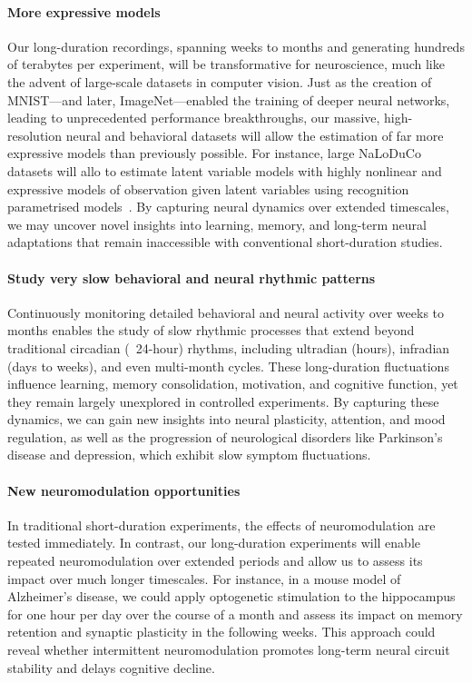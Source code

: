\documentclass[12pt]{article}
\begin{document}
\paragraph{More expressive models}
%
Our long-duration recordings, spanning weeks to months and generating hundreds
of terabytes per experiment, will be transformative for neuroscience, much like
the advent of large-scale datasets in computer vision.  Just as the creation of
MNIST—and later, ImageNet—enabled the training of deeper neural networks,
leading to unprecedented performance breakthroughs, our massive,
high-resolution neural and behavioral datasets will allow the estimation of far
more expressive models than previously possible.
%
For instance, large NaLoDuCo datasets will allo to estimate latent variable
models with highly nonlinear and expressive models of observation given latent
variables using recognition parametrised models~\citep{walkerEtAl23}.
%
By capturing neural dynamics over extended timescales, we may uncover novel
insights into learning, memory, and long-term neural adaptations that remain
inaccessible with conventional short-duration studies.

\paragraph{Study very slow behavioral and neural rhythmic patterns}
%
Continuously monitoring detailed behavioral and neural activity over weeks to
months enables the study of slow rhythmic processes that extend beyond
traditional circadian (~24-hour) rhythms, including ultradian (hours),
infradian (days to weeks), and even multi-month cycles. These long-duration
fluctuations influence learning, memory consolidation, motivation, and
cognitive function, yet they remain largely unexplored in controlled
experiments. By capturing these dynamics, we can gain new insights into neural
plasticity, attention, and mood regulation, as well as the progression of
neurological disorders like Parkinson’s disease and depression, which exhibit
slow symptom fluctuations.

\paragraph{New neuromodulation opportunities}
%
In traditional short-duration experiments, the effects of neuromodulation are
tested immediately. In contrast, our long-duration experiments will enable
repeated neuromodulation over extended periods and allow us to assess its
impact over much longer timescales.
%
For instance, in a mouse model of Alzheimer's disease, we could apply
optogenetic stimulation to the hippocampus for one hour per day over the course
of a month and assess its impact on memory retention and synaptic plasticity in
the following weeks. This approach could reveal whether intermittent
neuromodulation promotes long-term neural circuit stability and delays
cognitive decline.
\end{document}
